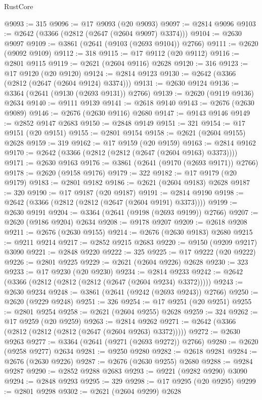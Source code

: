 \begin{lexlean}{RustCore}
\begin{coremodule}
@9093 := 315
@9096 := @17 @9093 (@20 @9093)
@9097 := @2814 @9096
@9103 := @2642 (@3366 (@2812 (@2647 (@2604 @9097) @3374)))
@9104 := @2630 @9097
@9109 := @3861 (@2641 (@9103 (@2693 @9104)) @2766)
@9111 := @2620 (@9092 @9109)
@9112 := 318
@9115 := @17 @9112 (@20 @9112)
@9116 := @2801 @9115
@9119 := @2621 (@2604 @9116) @2628
@9120 := 316
@9123 := @17 @9120 (@20 @9120)
@9124 := @2814 @9123
@9130 := @2642 (@3366 (@2812 (@2647 (@2604 @9124) @3374)))
@9131 := @2630 @9124
@9136 := @3364 (@2641 (@9130 (@2693 @9131)) @2766)
@9139 := @2620 (@9119 @9136) @2634
@9140 := @9111 @9139
@9141 := @2618 @9140
@9143 := @2676 (@2630 @9089)
@9146 := @2676 (@2630 @9116) @2680
@9147 := @9143 @9146
@9149 := @2852 @9147 @2683
@9150 := @2848 @9149
@9151 := 321
@9154 := @17 @9151 (@20 @9151)
@9155 := @2801 @9154
@9158 := @2621 (@2604 @9155) @2628
@9159 := 319
@9162 := @17 @9159 (@20 @9159)
@9163 := @2814 @9162
@9170 := @2642 (@3366 (@2812 (@2812 (@2647 (@2604 @9163) @3373))))
@9171 := @2630 @9163
@9176 := @3861 (@2641 (@9170 (@2693 @9171)) @2766)
@9178 := @2620 (@9158 @9176)
@9179 := 322
@9182 := @17 @9179 (@20 @9179)
@9183 := @2801 @9182
@9186 := @2621 (@2604 @9183) @2628
@9187 := 320
@9190 := @17 @9187 (@20 @9187)
@9191 := @2814 @9190
@9198 := @2642 (@3366 (@2812 (@2812 (@2647 (@2604 @9191) @3373))))
@9199 := @2630 @9191
@9204 := @3364 (@2641 (@9198 (@2693 @9199)) @2766)
@9207 := @2620 (@9186 @9204) @2634
@9208 := @9178 @9207
@9209 := @2618 @9208
@9211 := @2676 (@2630 @9155)
@9214 := @2676 (@2630 @9183) @2680
@9215 := @9211 @9214
@9217 := @2852 @9215 @2683
@9220 := @9150 (@9209 @9217) @3090
@9221 := @2848 @9220
@9222 := 325
@9225 := @17 @9222 (@20 @9222)
@9226 := @2801 @9225
@9229 := @2621 (@2604 @9226) @2628
@9230 := 323
@9233 := @17 @9230 (@20 @9230)
@9234 := @2814 @9233
@9242 := @2642 (@3366 (@2812 (@2812 (@2812 (@2647 (@2604 @9234) @3372)))))
@9243 := @2630 @9234
@9248 := @3861 (@2641 (@9242 (@2693 @9243)) @2766)
@9250 := @2620 (@9229 @9248)
@9251 := 326
@9254 := @17 @9251 (@20 @9251)
@9255 := @2801 @9254
@9258 := @2621 (@2604 @9255) @2628
@9259 := 324
@9262 := @17 @9259 (@20 @9259)
@9263 := @2814 @9262
@9271 := @2642 (@3366 (@2812 (@2812 (@2812 (@2647 (@2604 @9263) @3372)))))
@9272 := @2630 @9263
@9277 := @3364 (@2641 (@9271 (@2693 @9272)) @2766)
@9280 := @2620 (@9258 @9277) @2634
@9281 := @9250 @9280
@9282 := @2618 @9281
@9284 := @2676 (@2630 @9226)
@9287 := @2676 (@2630 @9255) @2680
@9288 := @9284 @9287
@9290 := @2852 @9288 @2683
@9293 := @9221 (@9282 @9290) @3090
@9294 := @2848 @9293
@9295 := 329
@9298 := @17 @9295 (@20 @9295)
@9299 := @2801 @9298
@9302 := @2621 (@2604 @9299) @2628

\end{coremodule}
\end{lexlean}
